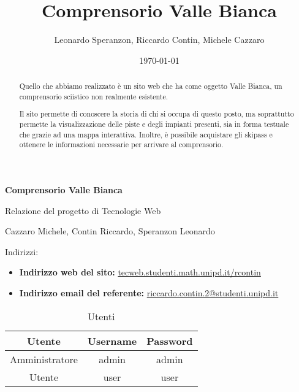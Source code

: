 \documentclass[12pt, a4paper]{article}
\title{Comprensorio Valle Bianca}
\author{Leonardo Speranzon, Riccardo Contin, Michele Cazzaro}
\date{\today}
\begin{document}
    \begin{titlepage}
        \begin{center}
            \vspace*{1cm}
            
            \Huge
            \textbf{Comprensorio Valle Bianca}

            \vspace{0.5cm}
            \LARGE
            Relazione del progetto di Tecnologie Web

            \vspace{1.5cm}
            \Large
            Cazzaro Michele, Contin Riccardo, Speranzon Leonardo
        \end{center}
            \vfill

            \large
            Indirizzi:
            \begin{itemize}
                \item \textbf{Indirizzo web del sito: } \url{tecweb.studenti.math.unipd.it/rcontin}
                \item \textbf{Indirizzo email del referente: } \href{mailto:riccardo.contin.2@studenti.unipd.it}{riccardo.contin.2@studenti.unipd.it}
            \end{itemize}

            \begin{table}[H]
                \centering
                \begin{tabular}{|c|c|c|}
                    \hline
                    \rowcolor[HTML]{96FFFB} 
                    \textbf{Utente} & \textbf{Username} & \textbf{Password} \\ \hline
                    Amministratore & admin & admin \\ \hline
                    Utente & user & user \\ \hline
                \end{tabular}
                \caption{Utenti}
            \end{table}
        
    \end{titlepage}

    \tableofcontents

    \newpage

    \begin{abstract}
        Quello che abbiamo realizzato è un sito web che ha come oggetto Valle Bianca, un comprensorio sciistico non realmente esistente.

        Il sito permette di conoscere la storia di chi si occupa di questo posto, ma soprattutto permette la visualizzazione delle piste e degli impianti presenti, sia in forma
        testuale che grazie ad una mappa interattiva. Inoltre, è possibile acquistare gli skipass e ottenere le informazioni necessarie per arrivare al comprensorio. 
    \end{abstract}

    
    \newpage
    
    \newpage
    
    \newpage
    
\end{document}
